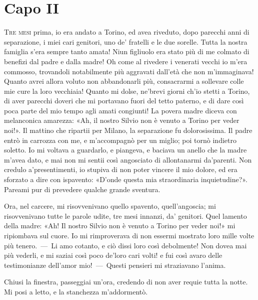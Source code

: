 
\chapter{Capo II}

\lettrine{T}{re mesi} prima, io era andato a Torino, ed avea riveduto, dopo parecchi
anni di separazione, i miei cari genitori, uno de' fratelli e le due
sorelle. Tutta la nostra famiglia s'era sempre tanto amata! Niun figliuolo
era stato più di me colmato di benefizi dal padre e dalla madre! Oh come al
rivedere i venerati vecchi io m'era commosso, trovandoli notabilmente più
aggravati dall'età che non m'immaginava! Quanto avrei allora voluto non
abbandonarli più, consacrarmi a sollevare colle mie cure la loro vecchiaia!
Quanto mi dolse, ne'brevi giorni ch'io stetti a Torino, di aver parecchi
doveri che mi portavano fuori del tetto paterno, e di dare così poca parte
del mio tempo agli amati congiunti! La povera madre diceva con melanconica
amarezza: «Ah, il nostro Silvio non è venuto a Torino per veder noi!». Il
mattino che ripartii per Milano, la separazione fu dolorosissima. Il padre
entrò in carrozza con me, e m'accompagnò per un miglio; poi tornò indietro
soletto. Io mi voltava a guardarlo, e piangeva, e baciava un anello che la
madre m'avea dato, e mai non mi sentii così angosciato di allontanarmi
da'parenti. Non credulo a'presentimenti, io stupiva di non poter vincere il
mio dolore, ed era sforzato a dire con ispavento: «D'onde questa mia
straordinaria inquietudine?». Pareami pur di prevedere qualche grande
sventura.

Ora, nel carcere, mi risovvenivano quello spavento, quell'angoscia; mi
risovvenivano tutte le parole udite, tre mesi innanzi, da' genitori. Quel
lamento della madre: «Ah! Il nostro Silvio non è venuto a Torino per veder
noi!» mi ripiombava sul cuore. Io mi rimproverava di non essermi mostrato
loro mille volte più tenero.~---~Li amo cotanto, e ciò dissi loro così
debolmente! Non dovea mai più vederli, e mi saziai così poco de'loro cari
volti! e fui così avaro delle testimonianze dell'amor mio!~---~Questi
pensieri mi straziavano l'anima.

Chiusi la finestra, passeggiai un'ora, credendo di non aver requie tutta la
notte. Mi posi a letto, e la stanchezza m'addormentò.
